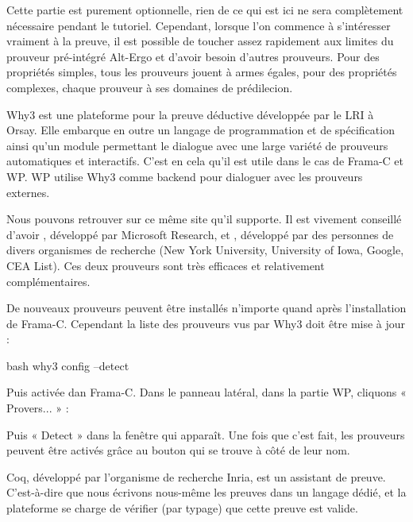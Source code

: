 

Cette partie est purement optionnelle, rien de ce qui est ici ne sera
complètement nécessaire pendant le tutoriel. Cependant, lorsque l'on commence à
s'intéresser vraiment à la preuve, il est possible de toucher assez rapidement
aux limites du prouveur pré-intégré Alt-Ergo et d'avoir besoin d'autres
prouveurs. Pour des propriétés simples, tous les prouveurs jouent à armes
égales, pour des propriétés complexes, chaque prouveur à ses domaines de
prédilecion.



Why3 est une plateforme pour la preuve déductive développée par le LRI à Orsay.
Elle embarque en outre un langage de programmation et de spécification ainsi
qu'un module permettant le dialogue avec une large variété de prouveurs
automatiques et interactifs. C'est en cela qu'il est utile dans le cas de
Frama-C et WP. WP utilise Why3 comme backend pour dialoguer avec les prouveurs
externes.


Nous pouvons retrouver sur ce même site
 qu'il supporte.
Il est vivement conseillé d'avoir ,
développé par Microsoft Research, et ,
développé par des personnes de divers organismes de recherche (New York
University, University of Iowa, Google, CEA List). Ces deux prouveurs sont très
efficaces et relativement complémentaires.


De nouveaux prouveurs peuvent être installés n'importe quand après
l'installation de Frama-C. Cependant la liste des prouveurs vus par Why3
doit être mise à jour :


\begin{CodeBlock}{bash}
why3 config --detect
\end{CodeBlock}


Puis activée dan Frama-C. Dans le panneau latéral, dans la partie WP,
cliquons « Provers... » :




Puis « Detect » dans la fenêtre qui apparaît. Une fois que c'est fait,
les prouveurs peuvent être activés grâce au bouton qui se trouve à côté
de leur nom.






Coq, développé par l'organisme de recherche Inria, est un assistant de
preuve. C'est-à-dire que nous écrivons nous-même les preuves dans un
langage dédié, et la plateforme se charge de vérifier (par typage) que
cette preuve est valide.



